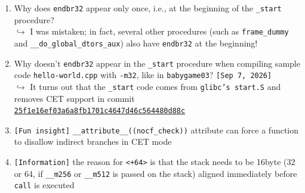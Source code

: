 \documentclass[main.tex]{subfiles}
\begin{document}
\begin{minipage}[t]{0.49\textwidth}
	\setlength{\parskip}{0.4em}
	\userline
	
	\setlength{\parskip}{1em}
	\begin{enumerate}
		\item[\texttt{[0]}] Why does \texttt{endbr32} appear only once, i.e., at the beginning of the \texttt{\_start} procedure?\\
		$\hookrightarrow$ I was mistaken; in fact, several other procedures (such as \texttt{frame\_dummy} and \texttt{\_\_do\_global\_dtors\_aux}) also have \texttt{endbr32} at the beginning!
		\item[\texttt{[0]}] Why doesn't \texttt{endbr32} appear in the \texttt{\_start} procedure when compiling sample code \texttt{hello-world.cpp} with \texttt{-m32}, like in \texttt{babygame03}? \texttt{[Sep 7, 2026]} \\
		$\hookrightarrow$ It turns out that the \texttt{\_start} code comes from \texttt{glibc’s start.S} and removes CET support in commit \href{https://sourceware.org/git/?p=glibc.git;a=commit;h=25f1e16ef03a6a8fb1701c4647d46c564480d88c}{\texttt{25f1e16ef03a6a8fb1701c4647d46c564480d88c}}
		\item[\texttt{[0]}] \texttt{[Fun insight]} \texttt{\_\_attribute\_\_((nocf\_check))} attribute can force a function to disallow indirect branches in CET mode
		\item[\texttt{[1]}] \texttt{[Information]} the reason for \texttt{<+64>} is that the stack needs to be 16byte (32 or 64, if \texttt{\_\_m256} or \texttt{\_\_m512} is passed on the stack) aligned immediately before \texttt{call} is executed
	\end{enumerate}
\end{minipage}
\hfill
\end{document}
